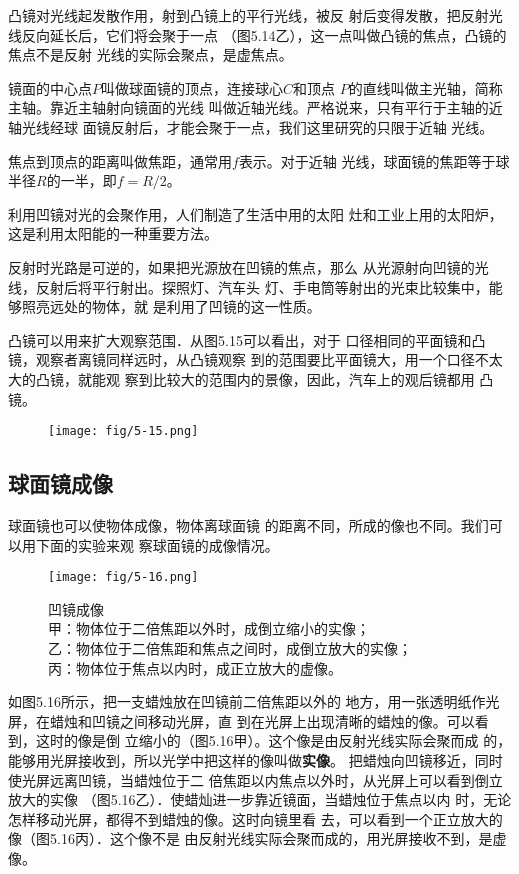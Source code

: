凸镜对光线起发散作用，射到凸镜上的平行光线，被反
射后变得发散，把反射光线反向延长后，它们将会聚于一点
（图5.14乙），这一点叫做凸镜的焦点，凸镜的焦点不是反射
光线的实际会聚点，是虚焦点。

镜面的中心点$P$叫做球面镜的顶点，连接球心$C$和顶点
$P$的直线叫做主光轴，简称主轴。靠近主轴射向镜面的光线
叫做近轴光线。严格说来，只有平行于主轴的近轴光线经球
面镜反射后，才能会聚于一点，我们这里研究的只限于近轴
光线。

焦点到顶点的距离叫做焦距，通常用$f$表示。对于近轴
光线，球面镜的焦距等于球半径$R$的一半，即$f=R/2$。

利用凹镜对光的会聚作用，人们制造了生活中用的太阳
灶和工业上用的太阳炉，这是利用太阳能的一种重要方法。

反射时光路是可逆的，如果把光源放在凹镜的焦点，那么
从光源射向凹镜的光线，反射后将平行射出。探照灯、汽车头
灯、手电筒等射出的光束比较集中，能够照亮远处的物体，就
是利用了凹镜的这一性质。

凸镜可以用来扩大观察范围．从图5.15可以看出，对于
口径相同的平面镜和凸镜，观察者离镜同样远时，从凸镜观察
到的范围要比平面镜大，用一个口径不太大的凸镜，就能观
察到比较大的范围内的景像，因此，汽车上的观后镜都用
凸镜。

\begin{figure}[htp]\centering
    \texttt{[image: fig/5-15.png]}
    \caption{}
    \end{figure}

\subsection{球面镜成像}
球面镜也可以使物体成像，物体离球面镜
的距离不同，所成的像也不同。我们可以用下面的实验来观
察球面镜的成像情况。
\begin{figure}[htp]\centering
    \texttt{[image: fig/5-16.png]}
    \caption{凹镜成像\\
    甲：物体位于二倍焦距以外时，成倒立缩小的实像；\\
    乙：物体位于二倍焦距和焦点之间时，成倒立放大的实像；\\
    丙：物体位于焦点以内时，成正立放大的虚像。}
    \end{figure}

如图5.16所示，把一支蜡烛放在凹镜前二倍焦距以外的
地方，用一张透明纸作光屏，在蜡烛和凹镜之间移动光屏，直
到在光屏上出现清晰的蜡烛的像。可以看到，这时的像是倒
立缩小的（图5.16甲）。这个像是由反射光线实际会聚而成
的，能够用光屏接收到，所以光学中把这样的像叫做\textbf{实像}。
把蜡烛向凹镜移近，同时使光屏远离凹镜，当蜡烛位于二
倍焦距以内焦点以外时，从光屏上可以看到倒立放大的实像
（图5.16乙）．使蜡灿进一步靠近镜面，当蜡烛位于焦点以内
时，无论怎样移动光屏，都得不到蜡烛的像。这时向镜里看
去，可以看到一个正立放大的像（图5.16丙）．这个像不是
由反射光线实际会聚而成的，用光屏接收不到，是虚像。

